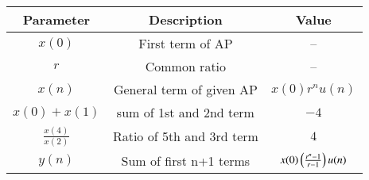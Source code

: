 \begin{tabular}{|c|c|c|}
      \hline
      Parameter & Description & Value\\\hline
      $x(0)$ & First term of AP & --\\\hline
      $r$ & Common ratio & --\\\hline
      $x(n)$ & General term of given AP & $x(0)r^nu(n)$\\\hline
      $x(0)+x(1)$ & sum of 1st and 2nd term & $-4$\\\hline
      $\displaystyle\frac{x(4)}{x(2)}$ & Ratio of 5th and 3rd term & $4$\\\hline
      $y(n)$ & Sum of first n+1 terms & $x(0)\left(\frac{r^n-1}{r-1}\right)u(n)$\\\hline
\end{tabular}
